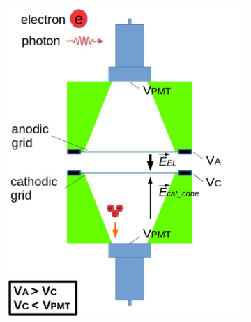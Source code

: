 \begin{figure}[!p]
 \centering
 \begin{subfigure}[b]{\halfwidth}
 			\centering
   \includegraphics[width=\figurewidth,clip,trim={0 0 0 0},angle=0,origin=c]{Figures/GasTest/WeiDrawEvent/GoodConfig.jpg}
   \caption{}
   \label{fig:BelowCathodeIllustration:GoodConfig}
 \end{subfigure}
 \begin{subfigure}[b]{\halfwidth}
 			\centering

\end{subfigure}
\end{figure}
